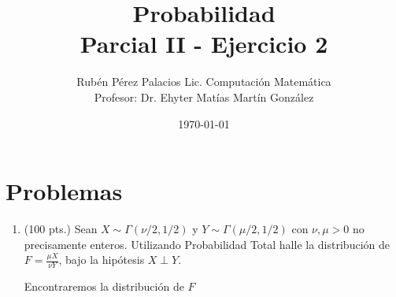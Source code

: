 \documentclass[letterpaper]{article}
\title{Probabilidad \\Parcial II - Ejercicio 2}
\author{Rubén Pérez Palacios Lic. Computación Matemática\\Profesor: Dr. Ehyter Matías Martín González}
\date{\today}
\theoremstyle{definition}
\theoremstyle{lemathm}
\theoremstyle{lemathm}
\theoremstyle{lemademthm}
\newcommand{\1}{\mathbbm{1}}
\begin{document}
	\maketitle
    
    \section*{Problemas}

    \begin{enumerate}
        
		\item (100 pts.) Sean $X\sim\Gamma( \nu/2,1/2)$ y $Y\sim\Gamma( \mu/2,1/2)$ con $\nu,\mu>0$ no precisamente enteros. Utilizando Probabilidad Total halle la distribución de $F=\frac{\mu X}{\nu Y}$, bajo la hipótesis $X\perp Y$.
		
		Encontraremos la distribución de $F$


\end{enumerate}
\end{document}
